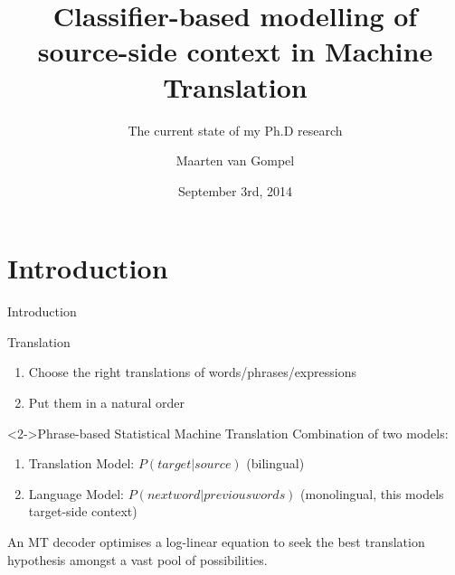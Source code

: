 \documentclass[compress]{beamer}
\title{Classifier-based modelling of source-side context in Machine Translation}
\subtitle{The current state of my Ph.D research}
\author{Maarten van Gompel}
\institute{Centre for Language Studies, Radboud University Nijmegen}
\date{September 3rd, 2014}
\begin{document}
\begin{frame}
\maketitle
\end{frame}

\section{Introduction}


\begin{frame}{Introduction}


  \begin{block}{Translation}
    \begin{enumerate}
      \item Choose the right translations of words/phrases/expressions
      \item Put them in a natural order
    \end{enumerate}
  \end{block}

  \begin{block}<2->{Phrase-based Statistical Machine Translation}
    Combination of two models:
    \begin{enumerate}
      \item Translation Model: $P(target|source)$ (bilingual)
      \item Language Model: $P(nextword|previouswords)$  (monolingual, this
        models target-side context)
    \end{enumerate}

    An MT decoder optimises a log-linear equation to seek the best translation
    hypothesis amongst a vast pool of possibilities.
  \end{block}

\end{frame}
\end{document}
